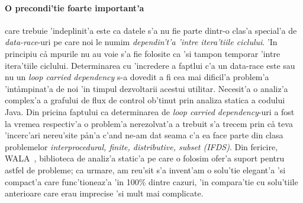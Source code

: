 \paragraph{O precondi'tie foarte important'a} care trebuie 'indeplinit'a este ca
datele s'a nu fie parte dintr-o clas'a special'a de \emph{data-race}-uri pe care
noi le numim \emph{dependin't'a 'intre itera'tiile ciclului}. 'In principiu c\aa
mpurile nu au voie s'a fie folosite ca 'si tampon temporar 'intre itera'tiile
ciclului. Determinarea cu 'incredere a faptlui c'a un data-race este sau nu un
\emph{loop carried dependency} s-a dovedit a fi cea mai dificil'a problem'a
'int\aa mpinat'a de noi 'in timpul dezvoltarii acestui utilitar. Necesit'a o
analiz'a complex'a a grafului de flux de control ob'tinut prin analiza statica a
codului Java.
Din pricina faptului ca determinarea de \emph{loop carried dependency}-uri a fost
la vremea respectiv'a o problem'a nerezolvat'a a trebuit s'a trecem prin c\aa
teva 'incerc'ari nereu'site p\aa n'a c'and ne-am dat seama c'a ea face parte din
clasa problemelor \emph{interprocedural, finite, distributive, subset (IFDS)}.
Din fericire, WALA~\cite{wala-site}, biblioteca de analiz'a static'a pe care o
folosim ofer'a suport pentru astfel de probleme; ca urmare, am reu'sit s'a
invent'am o solu'tie elegant'a 'si compact'a care func'tioneaz'a 'in 100\%
dintre cazuri, 'in compara'tie cu solu'tiile anterioare care erau imprecise 'si
mult mai complicate.


